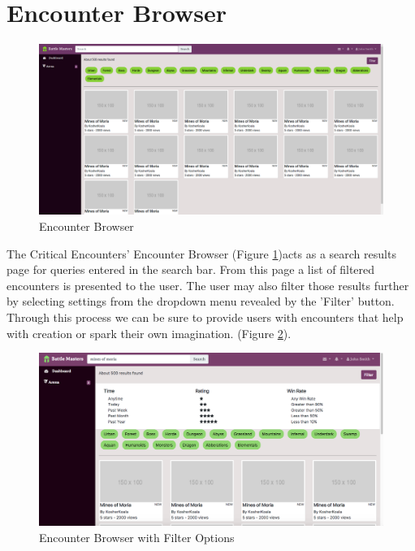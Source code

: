 \documentclass[12pt,a4paper]{report}
\begin{document}
	\section{Encounter Browser}
	\begin{figure}[H]
		\centering
		\includegraphics[scale=.19]{search}
		\caption{Encounter Browser}
		\label{fig: Encounter Browser}
	\end{figure}
	The Critical Encounters' Encounter Browser (Figure \ref{fig: Encounter Browser})acts as a search results page for queries entered in the search bar. From this page a list of filtered encounters is presented to the user. The user may also filter those results further by selecting settings from the dropdown menu revealed by the 'Filter' button. Through this process we can be sure to provide users with encounters that help with creation or spark their own imagination. (Figure \ref{fig: Encounter Browser with Filter Options}).
	\begin{figure}[H]
		\centering
		\includegraphics[scale=.25]{search_filtered}
		\caption{Encounter Browser with Filter Options}
		\label{fig: Encounter Browser with Filter Options}	
	\end{figure}
	\newpage
\end{document}
